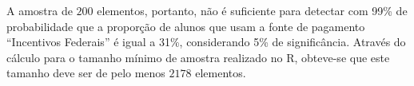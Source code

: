 A amostra de $200$ elementos, portanto, não é suficiente para detectar com 99\% de probabilidade que a proporção
de alunos que usam a fonte de pagamento ``Incentivos Federais'' é igual a 31\%, considerando 5\% de significância.
Através do cálculo para o tamanho mínimo de amostra realizado no R, 
obteve-se que este tamanho deve ser de pelo menos $2178$ elementos.

